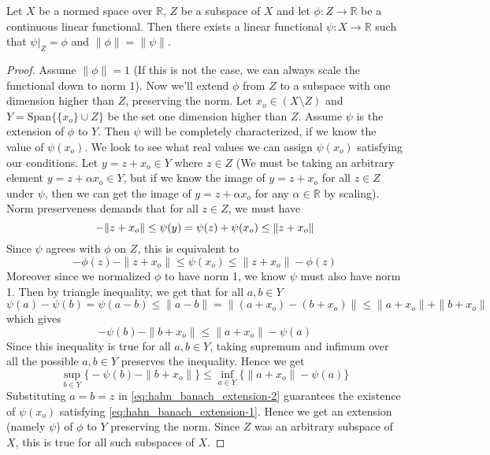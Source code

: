 \begin{theorem}
  Let $X$ be a normed space over $\mathbb{R}$, $Z$ be a subspace of $X$ and let $\phi: Z \to  \mathbb{R}$ be a continuous linear functional. Then there exists a linear functional $\psi: X \to \mathbb{R}$ such that $\psi|_Z = \phi$ and $\|\phi\| = \|\psi\|$.
  \label{thm:hahn-banach-extension}
\end{theorem}
\begin{proof}
  Assume $\|\phi\| = 1$ (If this is not the case, we can always scale the functional down to norm 1). Now we'll extend $\phi$ from $Z$ to a subspace with one dimension higher than $Z$, preserving the norm. Let $x_o \in (X \setminus Z)$ and $Y = \textrm{Span}\{ \{ x_o \} \cup Z \}$ be the set one dimension higher than $Z$. Assume $ \psi$ is the extension of $\phi$ to $Y$. Then $\psi$ will be completely characterized, if we know the value of $\psi(x_o)$. We look to see what real values we can assign $\psi(x_o)$ satisfying our conditions. Let $y = z +  x_o \in Y$ where $z \in Z$ (We must be taking an arbitrary element $y = z + \alpha x_o \in Y$, but if we know the image of $y = z + x_o$ for all $z \in Z$ under $\psi$, then we can get the image of $y = z + \alpha x_o$ for any $ \alpha \in \mathbb{R}$ by scaling). Norm preserveness demands that for all $z \in Z$, we must have \[
    -\|z +  x_o\| \le \psi(y) = \psi(z) + \psi(x_o) \le \|z + x_o\| \\
  \]
  Since $\psi$ agrees with $\phi$ on $Z$, this is equivalent to \begin{equation}
    \label{eq:hahn_banach_extension-1}
  -\phi(z) - \|z + x_o\| \le \psi(x_o) \le \|z + x_o\| - \phi(z)
    \end{equation}
  Moreover since we normalized $\phi$ to have norm 1, we know $\psi$ must also have norm 1. Then by triangle inequality, we get that for all $ a, b \in Y$ \[
    \psi(a) - \psi(b)  = \psi(a - b) \le \| a - b\| = \|(a+x_o) - ( b + x_o)\| \le \|a + x_o\| + \|b+x_o\|
  \]
  which gives \[
    - \psi(b) - \|b + x_o\| \le \|a + x_o\| - \psi(a)
  \]
  Since this inequality is true for all $a, b \in Y$, taking supremum and infimum over all the possible $ a, b \in Y$ preserves the inequality. Hence we get \begin{equation}
    \label{eq:hahn_banach_extension-2}
    \sup_{b \in Y} \Big \{- \psi(b) - \|b + x_o\|\Big \} \le \inf_{a \in Y} \Big\{ \|a + x_o\| - \psi(a) \Big \}
  \end{equation}
  Substituting $a = b = z$ in \autoref{eq:hahn_banach_extension-2} guarantees the existence of $\psi(x_o)$ satisfying \autoref{eq:hahn_banach_extension-1}. Hence we get an extension (namely $\psi$) of $\phi$ to $Y$ preserving the norm. Since $Z$ was an arbitrary subspace of $X$, this is true for all such subspaces of $X$.



\end{proof}
